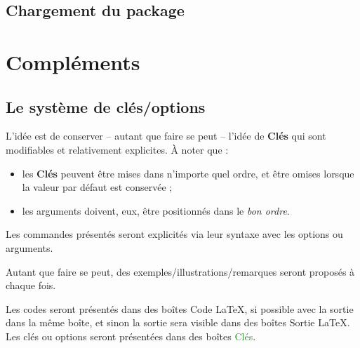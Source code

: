 \documentclass[a4paper]{article}
\newcommand\Cle[1]{{\bfseries\sffamily\textlangle #1\textrangle}}
\begin{document}
\subsection{Chargement du package}



\section{Compléments}

\subsection{Le système de \og clés/options \fg}

\begin{codeidee}
L'idée est de conserver -- autant que faire se peut -- l'idée de \Cle{Clés} qui sont modifiables et relativement explicites. À noter que :
%
\begin{itemize}[leftmargin=*]
	\item les \Cle{Clés} peuvent être mises dans n'importe quel ordre, et être omises lorsque la valeur par défaut est conservée ;
	\item les \textsf{arguments} doivent, eux, être positionnés dans le \textit{bon ordre}.
\end{itemize}
\end{codeidee}

\begin{codeinfo}
Les \textsf{commandes} présentés seront explicités via leur \textsf{syntaxe} avec les \textsf{options} ou \textsf{arguments}.

Autant que faire se peut, des exemples/illustrations/remarques seront proposés à chaque fois.

\smallskip

Les \textsf{codes} seront présentés dans des \textsf{boîtes} \textcolor{red!75!black}{{\small \faCode} Code \LaTeX}, si possible avec la \textsf{sortie} dans la même boîte, et sinon la \textsf{sortie} sera visible dans des \textsf{boîtes} \textcolor{red!75!black}{{\small \faArrowAltCircleRight[regular]} Sortie \LaTeX}. Les \textsf{clés} ou \textsf{options} seront présentées dans des \textsf{boîtes} \textcolor{ForestGreen}{{\small \faPaperclip} Clés}.
\end{codeinfo}
\end{document}
